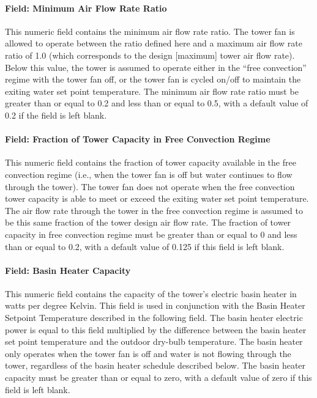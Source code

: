 \paragraph{Field: Minimum Air Flow Rate Ratio}\label{field-minimum-air-flow-rate-ratio-1}

This numeric field contains the minimum air flow rate ratio. The tower fan is allowed to operate between the ratio defined here and a maximum air flow rate ratio of 1.0 (which corresponds to the design {[}maximum{]} tower air flow rate). Below this value, the tower is assumed to operate either in the ``free convection'' regime with the tower fan off, or the tower fan is cycled on/off to maintain the exiting water set point temperature. The minimum air flow rate ratio must be greater than or equal to 0.2 and less than or equal to 0.5, with a default value of 0.2 if the field is left blank.

\paragraph{Field: Fraction of Tower Capacity in Free Convection Regime}\label{field-fraction-of-tower-capacity-in-free-convection-regime}

This numeric field contains the fraction of tower capacity available in the free convection regime (i.e., when the tower fan is off but water continues to flow through the tower). The tower fan does not operate when the free convection tower capacity is able to meet or exceed the exiting water set point temperature. The air flow rate through the tower in the free convection regime is assumed to be this same fraction of the tower design air flow rate. The fraction of tower capacity in free convection regime must be greater than or equal to 0 and less than or equal to 0.2, with a default value of 0.125 if this field is left blank.

\paragraph{Field: Basin Heater Capacity}\label{field-basin-heater-capacity-3}

This numeric field contains the capacity of the tower's electric basin heater in watts per degree Kelvin. This field is used in conjunction with the Basin Heater Setpoint Temperature described in the following field. The basin heater electric power is equal to this field multiplied by the difference between the basin heater set point temperature and the outdoor dry-bulb temperature. The basin heater only operates when the tower fan is off and water is not flowing through the tower, regardless of the basin heater schedule described below. The basin heater capacity must be greater than or equal to zero, with a default value of zero if this field is left blank.

